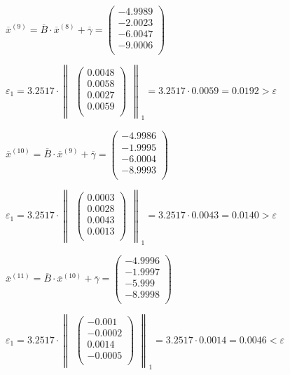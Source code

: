 \documentclass[10pt, a4paper]{scrartcl}
\begin{document}
\(\overline{x}^{(9)} = \overline{B} \cdot \overline{x}^{(8)} + \overline{\gamma} = \begin{pmatrix} -4.9989\\ -2.0023\\ -6.0047\\ -9.0006\\ \end{pmatrix}\)

\(\varepsilon_1 = 3.2517 \cdot \begin{Vmatrix}\begin{pmatrix} 0.0048\\ 0.0058\\ 0.0027\\ 0.0059\\ \end{pmatrix}\end{Vmatrix} _1 = 3.2517 \cdot 0.0059 = 0.0192 > \varepsilon\)

\(\overline{x}^{(10)} = \overline{B} \cdot \overline{x}^{(9)} + \overline{\gamma} = \begin{pmatrix} -4.9986\\ -1.9995\\ -6.0004\\ -8.9993\\ \end{pmatrix}\)

\(\varepsilon_1 = 3.2517 \cdot \begin{Vmatrix}\begin{pmatrix} 0.0003\\ 0.0028\\ 0.0043\\ 0.0013\\ \end{pmatrix}\end{Vmatrix} _1 = 3.2517 \cdot 0.0043 = 0.0140 > \varepsilon\)

\(\overline{x}^{(11)} = \overline{B} \cdot \overline{x}^{(10)} + \overline{\gamma} = \begin{pmatrix} -4.9996\\ -1.9997\\ -5.999\\ -8.9998\\ \end{pmatrix}\)

\(\varepsilon_1 = 3.2517 \cdot \begin{Vmatrix}\begin{pmatrix} -0.001\\ -0.0002\\ 0.0014\\ -0.0005\\ \end{pmatrix}\end{Vmatrix} _1 = 3.2517 \cdot 0.0014 = 0.0046 < \varepsilon\)
\end{document}
